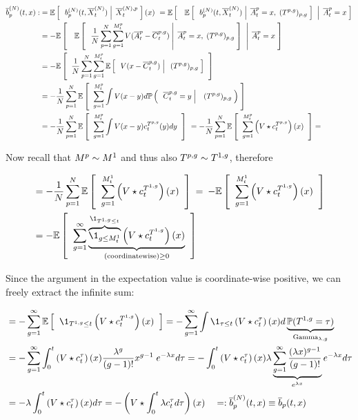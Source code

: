 \begin{align*}
\overline{b}_p^{(N)}(t, x) 
:&= \mathbb{E} \left[ \; \left. \; b_p^{(N)}(t, \overline{X}_t^{(N)}) \; \right| \;  \overline{X}_t^{(N),p} \; \right] (x)\
= \mathbb{E} \left[ \; \left. \; \; 
		\mathbb{E} \left[ \; \left. \; 
			b_p^{(N)}(t, \overline{X}_t^{(N)})		
		 \; \right| \; \overline{A}_t^p=x, \;(T^{p,g})_{p,g} \; \right]
	\; \; \right| \; \overline{A}_t^p=x \; \right]
\\
&= - \mathbb{E} \left[ \; \left. \; \; 
		\mathbb{E} \left[ \; \left. \; 
			\frac{1}{N} \sum _{p = 1}^{N} \sum_{g = 1}^{M_t^p} V(\overline{A}_t^p - \overline{C}_t^{p,g}) 
		 \; \right| \; \overline{A}_t^p=x, \;(T^{p,g})_{p,g} \; \right]
	\; \; \right| \; \overline{A}_t^p=x \; \right]
\\
&= - \mathbb{E} \left[ \; \; 
		\frac{1}{N} \sum _{p = 1}^{N} \sum_{g = 1}^{M_t^p} 
		\mathbb{E} \left[ \; \left. \; 
			V(x - \overline{C}_t^{p,g}) 
		 \; \right| \; \;(T^{p,g})_{p,g} \; \right]
	\; \; \right]
\\
&= - \frac{1}{N} \sum _{p = 1}^{N} \mathbb{E} \left[ \; \; 
		\sum_{g = 1}^{M_t^p} 
		\int 
			V(x - y) 
			d\mathbb{P} \left( \; \left. \; \overline{C}_t^{p,g} = y \; \right| \; \;\;(T^{p,g})_{p,g}  \; \right) \; \right]
\\
&= - \frac{1}{N} \sum _{p = 1}^{N} \mathbb{E} \left[ \; \; 
		\sum_{g = 1}^{M_t^p} 
		\int 
			V(x - y) 
			c_t^{T^{p,g}}(y)
		dy
	\; \; \right]\
= - \frac{1}{N} \sum _{p = 1}^{N} \mathbb{E} \left[ \; \; 
		\sum_{g = 1}^{M_t^p} 
			\left( V \star c_t^{T^{p,g}} \right) (x)
	\; \; \right]
	=
\end{align*}

Now recall that $M^p \sim M^1$ and thus also $T^{p,g} \sim T^{1,g}$, therefore

\begin{align*}
&= - \frac{1}{N} \sum _{p = 1}^{N} \E{\; 
		\sum_{g = 1}^{\hmactive_t^1} 
			\left( \attraction \star \cdens_t^{\btime^{1,g}} \right) (x)
	\;}
\:=\: 
- \E{\; 
		\sum_{g = 1}^{\hmactive_t^1} 
			\left( \attraction \star \cdens_t^{\btime^{1,g}} \right) (x)
	\;}
\\
&= - \E{\; 
		\sum_{g = 1}^{\infty} 
		\underbrace{
			\overbrace{
				\1_{g \leq \hmactive_t^1}
			}^{
				\1_{\btime^{1,g} \leq t}
			}
			\left( \attraction \star \cdens_t^{\btime^{1,g}} \right) (x)
		}_{\text{(coordinatewise)}\geq 0}
	\;}
\end{align*}

Since the argument in the expectation value is coordinate-wise positive, we can freely extract the infinite sum:

\begin{align*}
&= - \sum_{g = 1}^{\infty}
	\E{\; \1_{\btime^{1,g} \leq t}
		\left( \attraction \star \cdens_t^{\btime^{1,g}} \right) (x)
	\;}
= - \sum_{g = 1}^{\infty}
	\int
		\1_{\tau \leq t}
		\left( \attraction \star \cdens_t^{\tau} \right) (x)
	d \underbrace{\Prb ( \btime^{1,g} = \tau )}_{\Gma_{\lambda, g}}
\\
&= - \sum_{g = 1}^{\infty}
	\int_0^t
		\left( \attraction \star \cdens_t^\tau \right) (x)
	\frac{\lambda^g}{(g-1)!} x^{g-1} \; e^{ - \lambda x}
	d \tau
= - \int_0^t
		\left( \attraction \star \cdens_t^\tau \right) (x)
		\lambda
		\underbrace{
			\sum_{g = 1}^{\infty} \frac{(\lambda x)^{g-1}}{(g-1)!}
		}_{e^{\lambda x}}
		e^{ - \lambda x}
	d \tau
\\
&= -\lambda \int_0^t
		\left( \attraction \star \cdens_t^\tau \right) (x)
	d \tau
	=
	- \left( 
		\attraction \star \int_0^t \lambda \cdens_t^\tau 	d \tau
	\right) (x) 
	\quad
	=: \mfdrift_p^{(N)}(t, x) 
	\equiv
	\mfdrift_p (t, x)
\end{align*}


